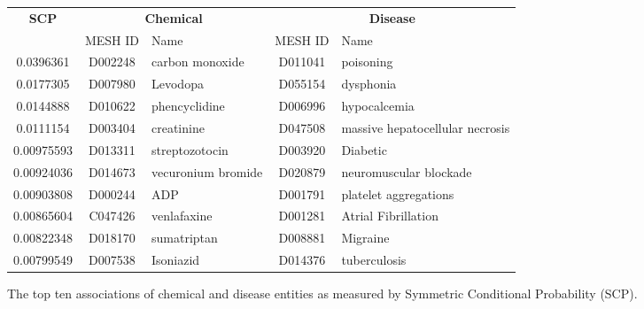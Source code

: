 \documentclass[10pt, oneside]{article}
\begin{document}
\begin{figure}[h]
\begin{center}
\fontsize{9}{11}\selectfont
\begin{tabular}{|*{2}{c|}p{4.5cm}|c|p{4.5cm}|}\hline
 \multirow{2}{*}{\textbf{SCP}} & \multicolumn{2}{c|}{\textbf{Chemical}} & \multicolumn{2}{c|}{\textbf{Disease}} \\ \cline{2-5}
 & MESH ID   & Name                      & MESH ID   & Name                         \\ \hline
 0.0396361  & D002248   & carbon monoxide    & D011041   & poisoning                       \\ \hline
 0.0177305  & D007980   & Levodopa           & D055154   & dysphonia                       \\ \hline
 0.0144888  & D010622   & phencyclidine      & D006996   & hypocalcemia                    \\ \hline
 0.0111154  & D003404   & creatinine         & D047508   & massive hepatocellular necrosis \\ \hline
 0.00975593 & D013311   & streptozotocin     & D003920   & Diabetic                        \\ \hline
 0.00924036 & D014673   & vecuronium bromide & D020879   & neuromuscular blockade          \\ \hline
 0.00903808 & D000244   & ADP                & D001791   & platelet aggregations           \\ \hline
 0.00865604 & C047426   & venlafaxine        & D001281   & Atrial Fibrillation             \\ \hline
 0.00822348 & D018170   & sumatriptan        & D008881   & Migraine                        \\ \hline
 0.00799549 & D007538   & Isoniazid          & D014376   & tuberculosis                    \\ \hline
\end{tabular}
\caption{\label{fig:scp} The top ten associations of chemical and disease entities as measured by Symmetric Conditional Probability (SCP).}
\end{center}
\end{figure}
\end{document}
